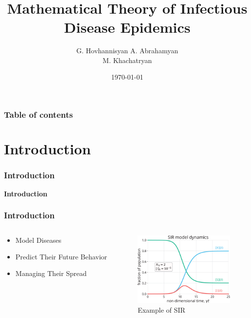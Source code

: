 \documentclass{beamer}
\begin{document}
\title{Mathematical Theory of Infectious Disease Epidemics}
\author{G. Hovhannisyan  A. Abrahamyan\\
M. Khachatryan}
\date{\today}


\begin{frame}
\titlepage
\end{frame}

\begin{frame}\frametitle{Table of contents}\tableofcontents
\end{frame}


\section{Introduction}
\begin{frame}\frametitle{Introduction}
    \begin{center}
        \textbf{Introduction}
    \end{center}
    \end{frame}

\begin{frame}\frametitle{Introduction}
\begin{center}
    \begin{columns}
        \begin{column}{5cm}
        \begin{itemize}
        \item Model Diseases
        \item Predict Their Future Behavior
        \item Managing Their Spread
        \end{itemize}
        \end{column}
        \begin{column}{5cm}
        \begin{figure}
            \caption{Example of SIR}
	        \centering
	        \includegraphics[width=5cm]{Figure1.png}
        \end{figure}
        \end{column}
        \end{columns}
\end{center}
\end{frame}
\end{document}
